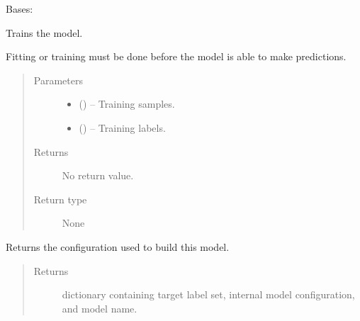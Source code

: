 \documentclass[letterpaper,10pt,english]{sphinxmanual}
\begin{document}
\begin{fulllineitems}
\label{\detokenize{KUHERD:KUHERD.Models.ClassificationModel}}
Bases: 

\begin{fulllineitems}
\label{\detokenize{KUHERD:KUHERD.Models.ClassificationModel.fit}}
Trains the model.

Fitting or \sphinxquotedblleft{}training\sphinxquotedblright{} must be done before the model is able to make predictions.
\begin{quote}\begin{description}
\item[{Parameters}] \leavevmode\begin{itemize}
\item {} 
 () -- Training samples.

\item {} 
 () -- Training labels.

\end{itemize}

\item[{Returns}] \leavevmode
No return value.

\item[{Return type}] \leavevmode
None

\end{description}\end{quote}

\end{fulllineitems}


\begin{fulllineitems}
\label{\detokenize{KUHERD:KUHERD.Models.ClassificationModel.get_config}}
Returns the configuration used to build this model.
\begin{quote}\begin{description}
\item[{Returns}] \leavevmode
dictionary containing target label set, internal model configuration, and model name.


\end{description}
\end{quote}
\end{fulllineitems}
\end{fulllineitems}
\end{document}
